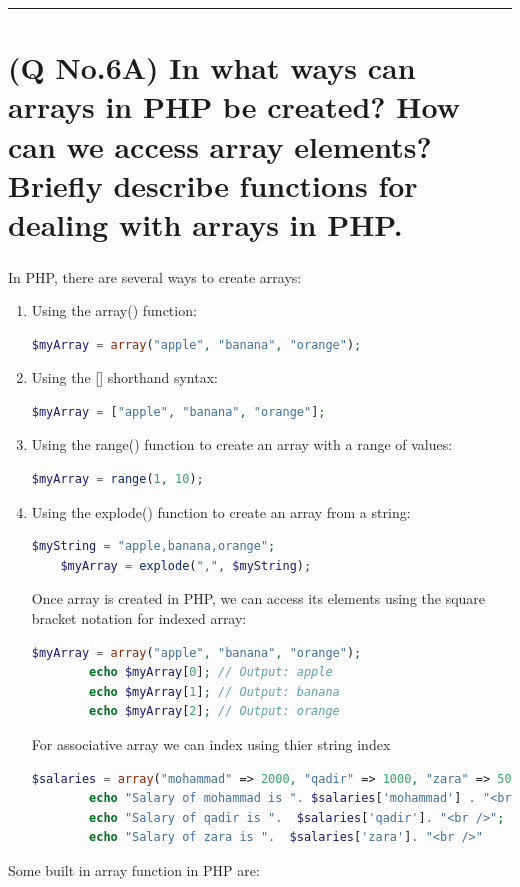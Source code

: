 \documentclass[11pt]{article}
\begin{document}
\noindent\rule{\linewidth}{0.4pt}
\section{(Q No.6A) In what ways can arrays in PHP be created? How can we access array elements? Briefly describe functions for dealing with arrays in PHP. } 
\subparagraph{}
In PHP, there are several ways to create arrays:

\begin{enumerate}
    \item Using the array() function:
    \begin{lstlisting}[language=php]
        $myArray = array("apple", "banana", "orange");
    \end{lstlisting}
    \item Using the [] shorthand syntax:
    \begin{lstlisting}[language=php]
        $myArray = ["apple", "banana", "orange"];
    \end{lstlisting}
    \item Using the range() function to create an array with a range of values:
    \begin{lstlisting}[language=php]
        $myArray = range(1, 10);
    \end{lstlisting}
    \item Using the explode() function to create an array from a string:
    \begin{lstlisting}[language=php]
        $myString = "apple,banana,orange";
    $myArray = explode(",", $myString);

    \end{lstlisting}

    Once array is created in PHP, we can access its elements using the square bracket notation for indexed array:
    \begin{lstlisting}[language=php]
        $myArray = array("apple", "banana", "orange");
        echo $myArray[0]; // Output: apple
        echo $myArray[1]; // Output: banana
        echo $myArray[2]; // Output: orange

    \end{lstlisting}
    For associative array we can index using thier string index
    \begin{lstlisting}[language=php]
        $salaries = array("mohammad" => 2000, "qadir" => 1000, "zara" => 500);
        echo "Salary of mohammad is ". $salaries['mohammad'] . "<br />";
        echo "Salary of qadir is ".  $salaries['qadir']. "<br />";
        echo "Salary of zara is ".  $salaries['zara']. "<br />"
    \end{lstlisting}
\end{enumerate}
Some built in array function in PHP are:
\end{document}

